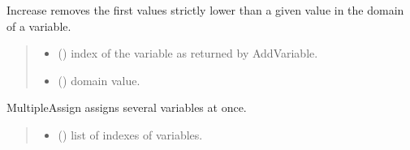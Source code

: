 \documentclass[letterpaper,10pt,openany,oneside,english]{sphinxmanual}
\begin{document}
\begin{fulllineitems}
\begin{fulllineitems}
\begin{quote}
\begin{description}
\end{description}\end{quote}

\end{fulllineitems}


\begin{fulllineitems}
\label{\detokenize{ref/ref_python:pytoulbar2.CFN.Increase}}
\pysigstartsignatures
{}
\pysigstopsignatures
\sphinxAtStartPar
Increase removes the first values strictly lower than a given value in the domain of a variable.
\begin{quote}\begin{description}
\begin{itemize}
\item {} 
\sphinxAtStartPar
{} () \textendash{} index of the variable as returned by AddVariable.

\item {} 
\sphinxAtStartPar
{} () \textendash{} domain value.

\end{itemize}

\end{description}\end{quote}

\end{fulllineitems}


\begin{fulllineitems}
\label{\detokenize{ref/ref_python:pytoulbar2.CFN.MultipleAssign}}
\pysigstartsignatures
{}
\pysigstopsignatures
\sphinxAtStartPar
MultipleAssign assigns several variables at once.
\begin{quote}\begin{description}
\begin{itemize}
\item {} 
\sphinxAtStartPar
{} () \textendash{} list of indexes of variables.


\end{itemize}
\end{description}
\end{quote}
\end{fulllineitems}
\end{fulllineitems}
\end{document}
